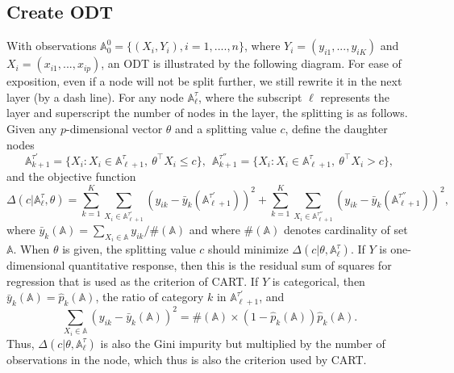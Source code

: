 \documentclass[nojss]{jss}
\numberwithin{equation}{section}
\begin{document}
\subsection{Create ODT}
With observations $ \mathbb{A}^0_0 = \{(X_i, Y_i), i = 1, ...., n \}$, where $ Y_i = (y_{i1}, ..., y_{iK}) $ and $ X_i = (x_{i1}, ..., x_{ip}) $,
an ODT is illustrated by the following diagram. For ease of exposition, even if a node will not be split further, we still rewrite it in the next layer (by a dash line).   For any node
$\mathbb{A}_\ell^\tau $, where the subscript $ \ell $  represents the layer and superscript the number of nodes in the layer, the splitting is as follows. Given any $p$-dimensional vector  $\theta$ and a splitting value $ c $, define the daughter nodes
  $$
    \mathbb{A}_{k+1}^{\tau'} = \{ X_i: X_i \in \mathbb{A}_{\ell+1}^\tau, \ \theta^\top X_i \le c\}, \ \
    \mathbb{A}_{k+1}^{\tau''} = \{ X_i: X_i \in \mathbb{A}_{\ell+1}^\tau, \ \theta^\top X_i > c\},
  $$
and the objective function
$$
  \Delta(c| \mathbb{A}_\ell^\tau, \theta)=  \sum_{k=1}^K \sum_{X_i \in \mathbb{A}_{\ell+1}^{\tau'}} (y_{ik} - \bar y_k(\mathbb{A}_{\ell+1}^{\tau'}))^2  + \sum_{k=1}^K \sum_{X_i \in \mathbb{A}_{\ell+1}^{\tau''}} (y_{ik} - \bar y_k(\mathbb{A}_{\ell+1}^{\tau''}))^2,
$$
where $ \bar y_k(\mathbb{A}) = \sum_{X_i \in \mathbb{A}} y_{ik} /\#(\mathbb{A}) $  and where $ \#(\mathbb{A}) $ denotes cardinality of  set $ \mathbb{A}$.  When $ \theta $ is given, the splitting value $ c$ should minimize $ \Delta(c|\theta,  \mathbb{A}_\ell^\tau)$. If $Y$ is one-dimensional quantitative response, then this is the residual sum of squares for regression that is used as the criterion of CART. If $Y$ is categorical, then $ \bar y_k(\mathbb{A})  =  \hat p_k(\mathbb{A}) $, the ratio of category $ k $ in $ \mathbb{A}_{\ell+1}^{\tau'} $, and
$$
\sum_{X_i \in \mathbb{A}} (y_{ik} -  \bar y_k(\mathbb{A}))^2  = \#( \mathbb{A}) \times  (1- \hat  p_k(\mathbb{A}))  \hat p_k(\mathbb{A}).
$$
Thus, $ \Delta(c|\theta, \mathbb{A}_\ell^\tau) $ is also the Gini impurity but multiplied by the number of observations in the node, which thus is also the criterion used by CART. %
\end{document}
